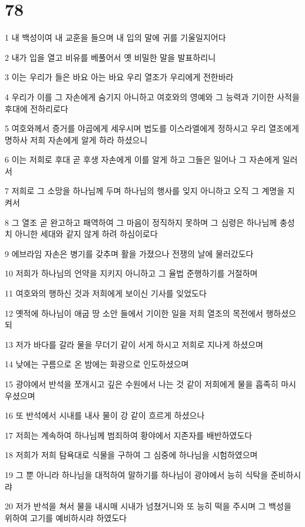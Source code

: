 \chapter{78}

\par 1 내 백성이여 내 교훈을 들으며 내 입의 말에 귀를 기울일지어다
\par 2 내가 입을 열고 비유를 베풀어서 옛 비밀한 말을 발표하리니
\par 3 이는 우리가 들은 바요 아는 바요 우리 열조가 우리에게 전한바라
\par 4 우리가 이를 그 자손에게 숨기지 아니하고 여호와의 영예와 그 능력과 기이한 사적을 후대에 전하리로다
\par 5 여호와께서 증거를 야곱에게 세우시며 법도를 이스라엘에게 정하시고 우리 열조에게 명하사 저희 자손에게 알게 하라 하셨으니
\par 6 이는 저희로 후대 곧 후생 자손에게 이를 알게 하고 그들은 일어나 그 자손에게 일러서
\par 7 저희로 그 소망을 하나님께 두며 하나님의 행사를 잊지 아니하고 오직 그 계명을 지켜서
\par 8 그 열조 곧 완고하고 패역하여 그 마음이 정직하지 못하며 그 심령은 하나님께 충성치 아니한 세대와 같지 않게 하려 하심이로다
\par 9 에브라임 자손은 병기를 갖추며 활을 가졌으나 전쟁의 날에 물러갔도다
\par 10 저희가 하나님의 언약을 지키지 아니하고 그 율법 준행하기를 거절하며
\par 11 여호와의 행하신 것과 저희에게 보이신 기사를 잊었도다
\par 12 옛적에 하나님이 애굽 땅 소안 들에서 기이한 일을 저희 열조의 목전에서 행하셨으되
\par 13 저가 바다를 갈라 물을 무더기 같이 서게 하시고 저희로 지나게 하셨으며
\par 14 낮에는 구름으로 온 밤에는 화광으로 인도하셨으며
\par 15 광야에서 반석을 쪼개시고 깊은 수원에서 나는 것 같이 저희에게 물을 흡족히 마시우셨으며
\par 16 또 반석에서 시내를 내사 물이 강 같이 흐르게 하셨으나
\par 17 저희는 계속하여 하나님께 범죄하여 황야에서 지존자를 배반하였도다
\par 18 저희가 저희 탐욕대로 식물을 구하여 그 심중에 하나님을 시험하였으며
\par 19 그 뿐 아니라 하나님을 대적하여 말하기를 하나님이 광야에서 능히 식탁을 준비하시랴
\par 20 저가 반석을 쳐서 물을 내시매 시내가 넘쳤거니와 또 능히 떡을 주시며 그 백성을 위하여 고기를 예비하시랴 하였도다
